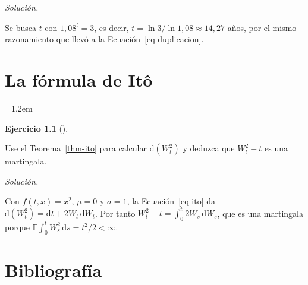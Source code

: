 \documentclass[
  spanish,
  letterpaper,
  a4paper,
  11pt,
  oneside,
  numbers=noenddot]{scrbook}
\newenvironment{atlasnota}{\par\medskip\begin{list}{}{\leftmargin=1.2em\rightmargin=0pt}\item\relax}{\end{list}\medskip}
\theoremstyle{plain}
\theoremstyle{plain}
\theoremstyle{definition}
\newtheorem{exercise}{Ejercicio}[chapter]
\theoremstyle{definition}
\theoremstyle{definition}
\theoremstyle{remark}
\begin{document}
\emph{Solución.}

Se busca \(t\) con \(1{,}08^{t} = 3\), es decir,
\(t = \ln 3 / \ln 1{,}08 \approx 14{,}27\) años, por el mismo
razonamiento que llevó a la Ecuación~\ref{eq-duplicacion}.


\chapter{La fórmula de Itô}\label{sec-ito}

\begin{atlasnota}

\end{atlasnota}

\begin{exercise}[]\protect\hypertarget{exr-ito-1}{}\label{exr-ito-1}

Use el Teorema~\ref{thm-ito} para calcular \(\mathrm{d}(W_t^{2})\) y
deduzca que \(W_t^{2} - t\) es una martingala.

\end{exercise}

\emph{Solución.}

Con \(f(t, x) = x^{2}\), \(\mu = 0\) y \(\sigma = 1\), la
Ecuación~\ref{eq-ito} da
\(\mathrm{d}(W_t^{2}) = \mathrm{d}t + 2 W_t \, \mathrm{d}W_t\). Por
tanto \(W_t^{2} - t = \int_0^t 2 W_s \, \mathrm{d}W_s\), que es una
martingala porque
\(\mathbb{E}\int_0^t W_s^{2} \, \mathrm{d}s = t^{2}/2 < \infty\).


\chapter*{Bibliografía}\label{bibliografuxeda}



\backmatter

\printindex
\end{document}
